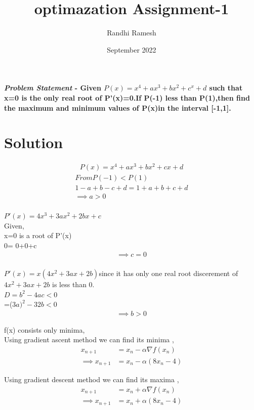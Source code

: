 \documentclass[journal,10pt,twocolumn]{article}
\title{\textbf{optimazation Assignment-1}}
\author{Randhi Ramesh}
\date{September 2022}
\providecommand{\brak}[1]{\ensuremath{\left(#1\right)}}
\providecommand{\brak}[1]{\ensuremath{\left(#1\right)}}
\numberwithin{equation}{subsection}
\begin{document}
\maketitle
\paragraph{\textit{Problem Statement} - Given  $P (x) = x^4+ ax^3+bx^2+c^x+d$ such that x=0 is the only real root of P'(x)=0.If P(-1) less than P(1),then find the maximum and minimum values of P(x)in the interval [-1,1]. }
\section*{\large Solution}
\begin{align}
P (x) = x^4+ ax^3+bx^2+cx+d
\end{align}
\begin{align}
From P(-1)<P(1)
\\
1-a+b-c+d=1+a+b+c+d
\\
\implies a >0
\end{align}
 \\
$P'(x) = 4x^3+ 3ax^2+2bx+c$
\\
Given,
\\
\textbf{}x=0 is a root of P'(x)
\\
0= 0+0+c
\\
 \begin{align}
 \implies c =0    
\end{align}
\\

 \textit{}$P'(x)= x(4x^2+3ax+2b)$since it has only one real root discerement of $4x^2+3ax+2b$ is less than 0.
\\
$D = b^2 -4ac<0$
\\
=($3a)^2-32b<0$
 \begin{align}
 \implies b >0    
\end{align}
 

f(x)  consists only minima,\\
Using gradient ascent method we can find its minima ,
    \begin{align}
        x_{n+1} &= x_n - \alpha \nabla f(x_n) \\
        \implies x_{n+1} &= x_n - \alpha \brak{8x_n-4}
    \end{align}

Using gradient descent method we can find its maxima ,
    \begin{align}
        x_{n+1} &= x_n + \alpha \nabla f(x_n) \\
        \implies x_{n+1} &= x_n + \alpha \brak{8x_n-4}
    \end{align}    
    
\end{document}
